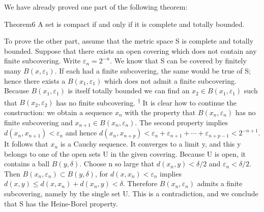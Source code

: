 We have already proved one part of the following theorem:

\begin{originalstatement}{Theorem}{6}\label{thm:3.6}
A set is compact if and only if it is complete and totally bounded.
\end{originalstatement}

To prove the other part, assume that the metric space S is complete and totally bounded. Suppose that there exists an open covering which does not contain any finite subcovering. Write $\varepsilon_{n}=2^{-n}$. We know that S can be covered by finitely many $B(x,\varepsilon_{1})$. If each had a finite subcovering, the same would be true of S; hence there exists a $B(x_{1},\varepsilon_{1})$ which does not admit a finite subcovering. Because $B(x_{1},\varepsilon_{1})$ is itself totally bounded we can find an $x_{2}\in B(x_{1},\varepsilon_{1})$ such that $B(x_{2},\varepsilon_{2})$ has no finite subcovering. \hyperlink{fn:77:dagger}{\textsuperscript{\ensuremath{\dagger}}} It is clear how to continue the construction: we obtain a sequence $x_{n}$ with the property that $B(x_{n},\varepsilon_{n})$ has no finite subcovering and $x_{n+1}\in B(x_{n},\varepsilon_{n})$. The second property implies $d(x_{n},x_{n+1})<\varepsilon_{n}$ and hence $d(x_{n},x_{n+p})<\varepsilon_{n}+\varepsilon_{n+1}+\cdots+\varepsilon_{n+p-1}<2^{-n+1}$. It follows that $x_{n}$ is a Cauchy sequence. It converges to a limit y, and this y belongs to one of the open sets U in the given covering. Because U is open, it contains a ball $B(y,\delta)$. Choose n so large that $d(x_{n},y)<\delta/2$ and $\varepsilon_{n}<\delta/2$. Then $B(x_{n},\varepsilon_{n})\subset B(y,\delta)$, for $d(x,x_{n})<\varepsilon_{n}$ implies $d(x,y)\leq d(x,x_{n})+d(x_{n},y)<\delta$. Therefore $B(x_{n},\varepsilon_{n})$ admits a finite subcovering, namely by the single set U. This is a contradiction, and we conclude that S has the Heine-Borel property.

